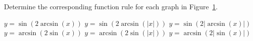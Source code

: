 \begin{Exercise} %
Determine the corresponding function rule for each graph in Figure~\ref{grafs}.
\begin{multicols}{2}
\Question  $y=\sin(2\arcsin(x))$
\Question $y=\sin(2\arcsin(|x|))$
\Question $y=\sin(2|\arcsin(x)|)$
\Question $y=\arcsin(2\sin(x))$
\Question $y=\arcsin(2\sin(|x|))$
\Question $y=\arcsin(2|\sin(x)|)$
\EndCurrentQuestion
\end{multicols}

\begin{figure}[H]
\centering
\centerline{
\hspace*{0.5cm}
}
\centerline{
\hspace*{0.5cm}
}
\caption{\label{grafs}}
\end{figure}
\end{Exercise}

